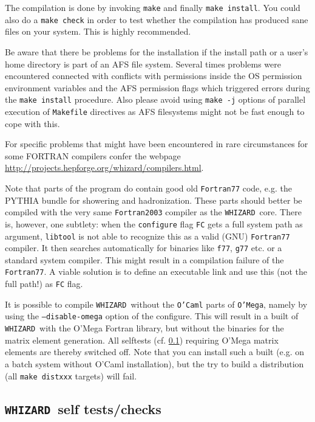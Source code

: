 \documentclass[12pt]{book}
\newcommand{\ttt}[1]{\texttt{#1}}
\newcommand{\whizard}{\texttt{WHIZARD}}
\begin{document}
The compilation is done by invoking \texttt{make} and finally
\texttt{make install}. You could also do a \texttt{make check} in
order to test whether the compilation has produced sane files on your
system. This is highly recommended.

Be aware that there be problems for the installation if the install
path or a user's home directory is part of an AFS file system. Several
times problems were encountered connected with conflicts with
permissions inside the OS permission environment variables and the AFS
permission flags which triggered errors during the \ttt{make install}
procedure. Also please avoid using \ttt{make -j} options of parallel
execution of \ttt{Makefile} directives as AFS filesystems might not be 
fast enough to cope with this.

For specific problems that might have been encountered in rare
circumstances for some FORTRAN compilers confer the webpage
\url{http://projects.hepforge.org/whizard/compilers.html}.

Note that parts of the program do contain good old \ttt{Fortran77}
code, e.g. the PYTHIA bundle for showering and hadronization. These
parts should better be compiled with the very same \ttt{Fortran2003}
compiler as the \whizard\ core. There is, however, one subtlety: 
when the \ttt{configure} flag \ttt{FC} gets a full system path as
argument, \ttt{libtool} is not able to recognize this as a valid (GNU)
\ttt{Fortran77} compiler. It then searches automatically for binaries 
like \ttt{f77}, \ttt{g77} etc. or a standard system compiler. This 
might result in a compilation failure of the \ttt{Fortran77}. A viable
solution is to define an executable link and use this (not the full
path!) as \ttt{FC} flag.

It is possible to compile \whizard\ without the \ttt{O'Caml} parts of
\ttt{O'Mega}, namely by using the \ttt{--disable-omega} option of the
configure. This will result in a built of \whizard\ with the O'Mega
Fortran library, but without the binaries for the matrix element
generation. All selftests (cf. \ref{sec:selftests}) requiring O'Mega
matrix elements are thereby switched off. Note that you can install
such a built (e.g. on a batch system without O'Caml installation), but
the try to build a distribution (all \ttt{make distxxx} targets) will fail.




\subsection{\whizard\ self tests/checks}
\label{sec:selftests}
\end{document}
